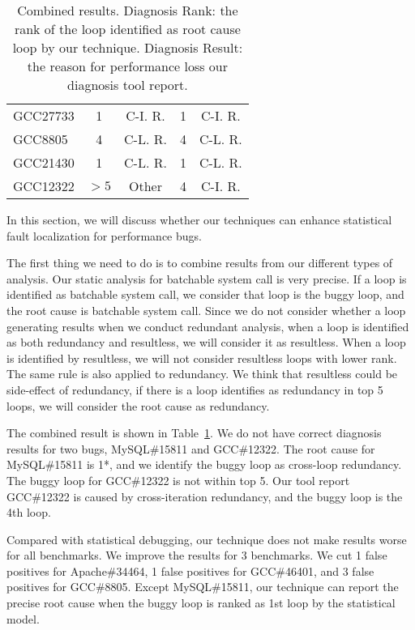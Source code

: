\begin{table}
\begin{tabular}{lcccc}
   GCC27733         & 1              &  C-I. R.    & 1              &  C-I. R.\\
   GCC8805          & 4              &  C-L. R.    & 4              &  C-L. R.\\
   GCC21430         & 1              &  C-L. R.    & 1              &  C-L. R.\\
   GCC12322         & $>5$           &  Other      & 4              &  C-I. R. \\
\bottomrule
   \end{tabular}
  \caption{Combined results. Diagnosis Rank: the rank of the loop identified as root cause loop by our technique. 
  Diagnosis Result: the reason for performance loss our diagnosis tool report.}
  \label{tab:final}
\end{table}

In this section, we will discuss whether our techniques can enhance statistical fault localization for performance bugs. 

The first thing we need to do is to combine results from our different types of analysis. 
Our static analysis for batchable system call is very precise. 
If a loop is identified as batchable system call, 
we consider that loop is the buggy loop, and the root cause is batchable system call. 
Since we do not consider whether a loop generating results when we conduct redundant analysis, 
when a loop is identified as both redundancy and resultless, we will consider it as resultless. 
When a loop is identified by resultless, we will not consider resultless loops with lower rank. 
The same rule is also applied to redundancy. 
We think that resultless could be side-effect of redundancy, 
if there is a loop identifies as redundancy in top 5 loops, 
we will consider the root cause as redundancy.  

The combined result is shown in Table~\ref{tab:final}. 
We do not have correct diagnosis results for two bugs, 
MySQL\#15811 and GCC\#12322. The root cause for MySQL\#15811 is 1*, 
and we identify the buggy loop as cross-loop redundancy. The buggy loop for GCC\#12322 is not within top 5.  
Our tool report GCC\#12322 is caused by cross-iteration redundancy, and the buggy loop is the 4th loop. 

Compared with statistical debugging, our technique does not make results worse for all benchmarks. 
We improve the results for 3 benchmarks. We cut 1 false positives for Apache\#34464, 1 false positives for GCC\#46401, and 3 false positives for GCC\#8805.
Except MySQL\#15811, our technique can report the precise root cause when the buggy loop is ranked as 1st loop by the statistical model. 
